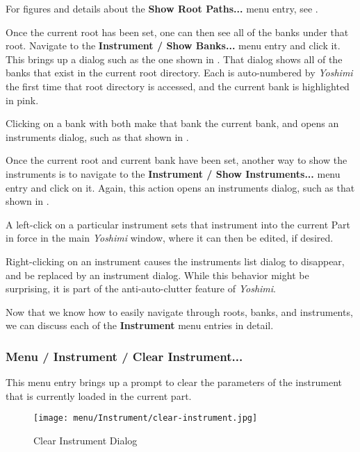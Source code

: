    For figures and details about the \textbf{Show Root Paths...} menu entry,
   see .

   Once the current root has been set, one can then see all of the banks
   under that root.  Navigate to the \textbf{Instrument / Show Banks...} menu
   entry and click it.  This brings up a dialog such as the one shown in
   .  That dialog shows all of the banks that
   exist in the current root directory.  Each is auto-numbered by
   \textsl{Yoshimi} the first time that root directory is accessed, and the
   current bank is highlighted in pink.

   Clicking on a bank with both make that bank the current bank, and opens an
   instruments dialog, such as that shown in
   .

   Once the current root and current bank have been set, another way to show
   the instruments is to navigate to the
   \textbf{Instrument / Show Instruments...} menu entry and click on it.
   Again, this action opens an instruments dialog, such as that shown in
   .

   A left-click on a particular instrument sets that instrument into the
   current Part in force in the main \textsl{Yoshimi} window, where it can
   then be edited, if desired.

   Right-clicking on an instrument causes the instruments list dialog
   to disappear, and be replaced by an instrument dialog.  While this
   behavior might be surprising, it is part of the anti-auto-clutter feature
   of \textsl{Yoshimi}.

   Now that we know how to easily navigate through roots, banks, and
   instruments, we can discuss each of the \textbf{Instrument} menu entries
   in detail.

\subsubsection{Menu / Instrument / Clear Instrument...}
\label{subsubsec:menu_instrument_clear}

   This menu entry brings up a prompt to clear the parameters of the
   instrument that is currently loaded in the current part.

\begin{figure}[H]
   \centering 
   \texttt{[image: menu/Instrument/clear-instrument.jpg]}
   \caption{Clear Instrument Dialog}
   \label{fig:clear_instrument_dialog}
\end{figure}

